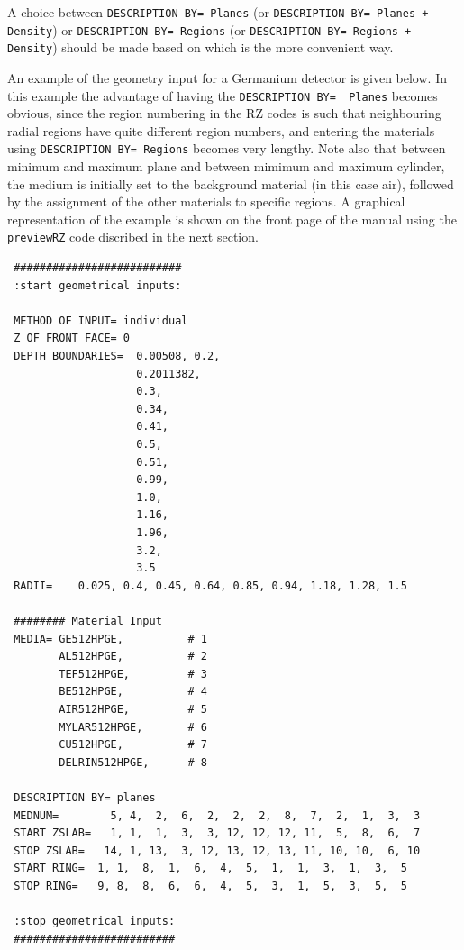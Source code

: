 \documentclass[12pt,twoside]{article}  %
\begin{document}
A choice between {\tt DESCRIPTION BY= Planes} (or
{\tt DESCRIPTION BY= Planes + Density}) or {\tt DESCRIPTION BY= Regions}
(or {\tt DESCRIPTION BY= Regions + Density}) should be made based on which
is the more convenient way.

An example of the geometry input for a Germanium detector is given below.
In this example the advantage of having the \verb+DESCRIPTION BY=  Planes+
becomes obvious, since the region numbering in the RZ codes is such that
neighbouring radial regions have quite different region numbers, and
entering the materials using \verb+DESCRIPTION BY= Regions+ becomes
very lengthy. Note also that between minimum and maximum plane and between
mimimum and maximum cylinder, the medium is initially
set to the background material
(in this case air), followed by the assignment of the other materials to
specific regions.  A graphical representation of the example is shown on
the front page of the manual using the \verb+previewRZ+ code discribed
in the next section.
\begin{verbatim}
 ##########################
 :start geometrical inputs:

 METHOD OF INPUT= individual
 Z OF FRONT FACE= 0
 DEPTH BOUNDARIES=  0.00508, 0.2,
                    0.2011382,
                    0.3,
                    0.34,
                    0.41,
                    0.5,
                    0.51,
                    0.99,
                    1.0,
                    1.16,
                    1.96,
                    3.2,
                    3.5
 RADII=    0.025, 0.4, 0.45, 0.64, 0.85, 0.94, 1.18, 1.28, 1.5

 ######## Material Input
 MEDIA= GE512HPGE,          # 1
        AL512HPGE,          # 2
        TEF512HPGE,         # 3
        BE512HPGE,          # 4
        AIR512HPGE,         # 5
        MYLAR512HPGE,       # 6
        CU512HPGE,          # 7
        DELRIN512HPGE,      # 8

 DESCRIPTION BY= planes
 MEDNUM=        5, 4,  2,  6,  2,  2,  2,  8,  7,  2,  1,  3,  3
 START ZSLAB=   1, 1,  1,  3,  3, 12, 12, 12, 11,  5,  8,  6,  7
 STOP ZSLAB=   14, 1, 13,  3, 12, 13, 12, 13, 11, 10, 10,  6, 10
 START RING=  1, 1,  8,  1,  6,  4,  5,  1,  1,  3,  1,  3,  5
 STOP RING=   9, 8,  8,  6,  6,  4,  5,  3,  1,  5,  3,  5,  5

 :stop geometrical inputs:
 #########################
\end{verbatim}

\end{document}
